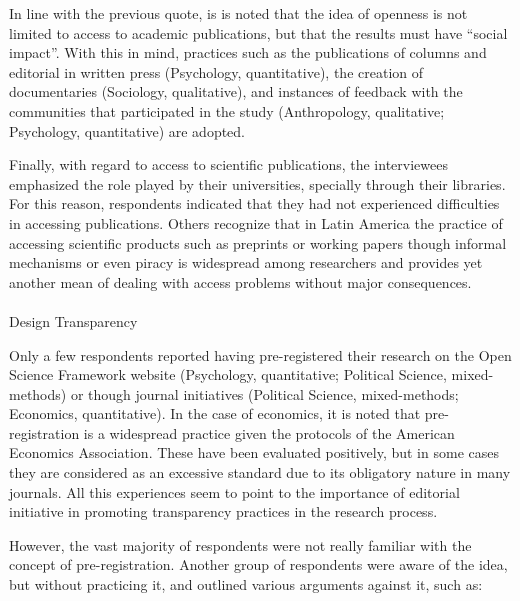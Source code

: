 \documentclass[
  english,
  letterpaper,
]{article}
\makeatletter
\let\oldparagraph\paragraph
\renewcommand{\paragraph}{
    \@ifstar
      \xxxParagraphStar
      \xxxParagraphNoStar
  }
\newcommand{\xxxParagraphStar}[1]{\oldparagraph*{#1}\mbox{}}
\newcommand{\xxxParagraphNoStar}[1]{\oldparagraph{#1}\mbox{}}
\makeatother
\begin{document}
In line with the previous quote, is is noted that the idea of openness
is not limited to access to academic publications, but that the results
must have ``social impact''. With this in mind, practices such as the
publications of columns and editorial in written press (Psychology,
quantitative), the creation of documentaries (Sociology, qualitative),
and instances of feedback with the communities that participated in the
study (Anthropology, qualitative; Psychology, quantitative) are adopted.

Finally, with regard to access to scientific publications, the
interviewees emphasized the role played by their universities, specially
through their libraries. For this reason, respondents indicated that
they had not experienced difficulties in accessing publications. Others
recognize that in Latin America the practice of accessing scientific
products such as preprints or working papers though informal mechanisms
or even piracy is widespread among researchers and provides yet another
mean of dealing with access problems without major consequences.

\paragraph{Design Transparency}\label{design-transparency}

Only a few respondents reported having pre-registered their research on
the Open Science Framework website (Psychology, quantitative; Political
Science, mixed-methods) or though journal initiatives (Political
Science, mixed-methods; Economics, quantitative). In the case of
economics, it is noted that pre-registration is a widespread practice
given the protocols of the American Economics Association. These have
been evaluated positively, but in some cases they are considered as an
excessive standard due to its obligatory nature in many journals. All
this experiences seem to point to the importance of editorial initiative
in promoting transparency practices in the research process.

However, the vast majority of respondents were not really familiar with
the concept of pre-registration. Another group of respondents were aware
of the idea, but without practicing it, and outlined various arguments
against it, such as:
\end{document}
